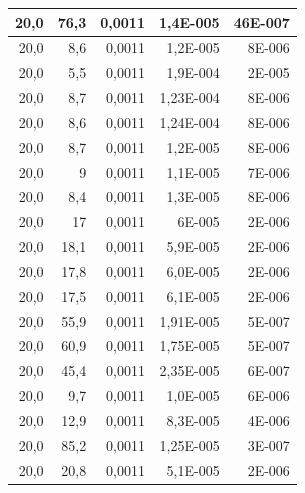 \documentclass[12pt]{scrartcl}
\begin{document}
\begin{table}[H]
\begin{center}
\begin{tabular}{|r|r|r|r|r|}
20,0 & 76,3 & 0,0011 & 1,4E-005 & 46E-007 \\ \hline
20,0 & 8,6 & 0,0011 & 1,2E-005 & 8E-006 \\ \hline
20,0 & 5,5 & 0,0011 & 1,9E-004 & 2E-005 \\ \hline
20,0 & 8,7 & 0,0011 & 1,23E-004 & 8E-006 \\ \hline
20,0 & 8,6 & 0,0011 & 1,24E-004 & 8E-006 \\ \hline
20,0 & 8,7 & 0,0011 & 1,2E-005 & 8E-006 \\ \hline
20,0 & 9 & 0,0011 & 1,1E-005 & 7E-006 \\ \hline
20,0 & 8,4 & 0,0011 & 1,3E-005 & 8E-006 \\ \hline
20,0 & 17 & 0,0011 & 6E-005 & 2E-006 \\ \hline
20,0 & 18,1 & 0,0011 & 5,9E-005 & 2E-006 \\ \hline
20,0 & 17,8 & 0,0011 & 6,0E-005 & 2E-006 \\ \hline
20,0 & 17,5 & 0,0011 & 6,1E-005 & 2E-006 \\ \hline
20,0 & 55,9 & 0,0011 & 1,91E-005 & 5E-007 \\ \hline
20,0 & 60,9 & 0,0011 & 1,75E-005 & 5E-007 \\ \hline
20,0 & 45,4 & 0,0011 & 2,35E-005 & 6E-007 \\ \hline
20,0 & 9,7 & 0,0011 & 1,0E-005 & 6E-006 \\ \hline
20,0 & 12,9 & 0,0011 & 8,3E-005 & 4E-006 \\ \hline
20,0 & 85,2 & 0,0011 & 1,25E-005 & 3E-007 \\ \hline
20,0 & 20,8 & 0,0011 & 5,1E-005 & 2E-006 \\ \hline
\end{tabular}
\end{center}
\label{tab:messwerte_2}
\end{table}
\end{document}
